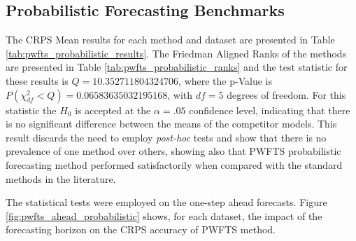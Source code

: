 \subsection{Probabilistic Forecasting Benchmarks}
\label{sec:pwfts_experiments_probabilistic}

The CRPS Mean results for each method and dataset are presented in Table \ref{tab:pwfts_probabilistic_results}. The Friedman Aligned Ranks of the methods are presented in Table \ref{tab:pwfts_probabilistic_ranks} and the test statistic for these results is $Q = 10.352711804324706$, where the p-Value is $P(\chi ^2_{df} < Q) = 0.06583635032195168$, with $df=5$ degrees of freedom. For this statistic the $H_0$ is accepted at the $\alpha = .05$ confidence level, indicating that there is no significant difference between the means of the competitor models. This result discards the need to employ \textit{post-hoc} tests and show that there is no prevalence of one method over others, showing also that PWFTS probabilistic forecasting method performed satisfactorily when compared with the standard methods in the literature. 

The statistical tests were employed on the one-step ahead forecasts. Figure \ref{fig:pwfts_ahead_probabilistic} shows, for each dataset, the impact of the forecasting horizon on the CRPS accuracy of PWFTS method.

\begin{table}[h]
    \caption{CRPS for one step ahead interval forecasts}
    \label{tab:pwfts_probabilistic_results}
\end{table}

